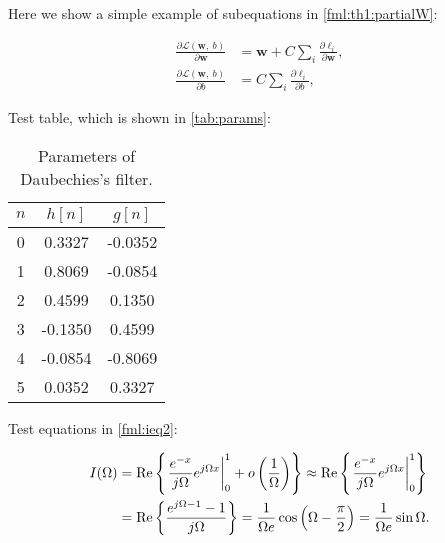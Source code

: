 \documentclass[color,hyper]{NRSMRev}
\begin{document}
\begin{theorem} \label{th1}
  Here we show a simple example of subequations in \eqref{fml:th1:partialW}:
  
  \begin{subequations}
    \renewcommand{\theequation}
    {\theparentequation-\arabic{equation}}
    \begin{align}
      \frac{\partial \mathcal{L}(\mathbf{w},~b)}{\partial \mathbf{w}} &= \mathbf{w} + C \sum\limits_i\frac{\partial \ell_i}{\partial \mathbf{w}}, \label{fml:th1:partialW}\\
      \frac{\partial \mathcal{L}(\mathbf{w},~b)}{\partial b} &= C \sum\limits_i\frac{\partial \ell_i}{\partial b}, \label{fml:th1:partialb}
    \end{align}
  \end{subequations}
\end{theorem}

Test table, which is shown in \autoref{tab:params}:

\begin{table}[htbp]
  \centering
  \caption{Parameters of Daubechies's filter.}
  \label{tab:params}
  \begin{tabular}{|c|c|c|}
    \hline
    $n$ & $h[n]$ & $g[n]$ \\ \hline
    0 &  0.3327 & -0.0352 \\ \hline
    1 &  0.8069 & -0.0854 \\ \hline
    2 &  0.4599 &  0.1350 \\ \hline
    3 & -0.1350 &  0.4599 \\ \hline
    4 & -0.0854 & -0.8069 \\ \hline
    5 &  0.0352 &  0.3327 \\ \hline
  \end{tabular}
\end{table}

Test equations in \eqref{fml:ieq2}:

\begin{equation} \label{fml:ieq2}
  \begin{aligned}
    I (\Omega) &= \mathrm{Re}\left\{  \left. \frac{e^{-x}}{j \Omega} e^{j \Omega x} \right|_0^1 + o\left( \frac{1}{\Omega} \right)  \right\} \approx \mathrm{Re}\left\{  \left. \frac{e^{-x}}{j \Omega} e^{j \Omega x} \right|_0^1  \right\} \\
    &= \mathrm{Re}\left\{  \frac{e^{j\Omega-1} - 1}{j \Omega}  \right\} = \frac{1}{\Omega e} \cos \left( \Omega - \frac{\pi}{2} \right) = \frac{1}{\Omega e} \sin \Omega. 
  \end{aligned}
\end{equation}
\end{document}
